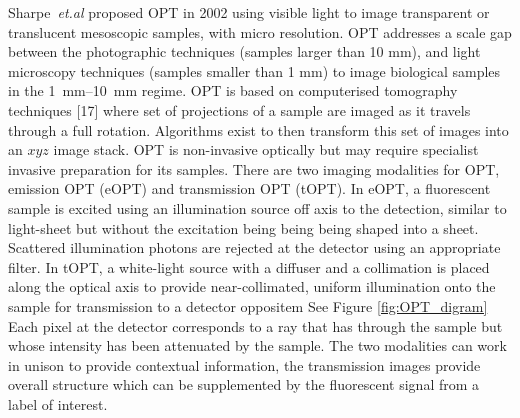 
Sharpe~\emph{et.al} proposed \gls{OPT} in 2002 \cite{sharpe_optical_2002}
using visible light to image transparent or translucent mesoscopic samples, with micro resolution.
\gls{OPT} addresses a scale gap between the photographic techniques (samples larger than 10 mm), and light microscopy techniques (samples smaller than 1 mm) to image biological samples in the \SIrange{1}{10}{\milli\meter} regime.
\gls{OPT} is based on computerised tomography techniques [17] where set of projections of a sample are imaged as it travels through a full rotation.
Algorithms exist to then transform this set of images into an $xyz$ image stack.
OPT is non-invasive optically but may require specialist invasive preparation for its samples.
There are two imaging modalities for OPT, emission \gls{OPT} (eOPT) and transmission OPT (tOPT).
In eOPT, a fluorescent sample is excited using an illumination source off axis to the detection, similar to light-sheet but without the excitation being being being shaped into a sheet.
Scattered illumination photons are rejected at the detector using an appropriate filter.
In tOPT, a white-light source with a diffuser and a collimation is placed along the optical axis to provide near-collimated, uniform illumination onto the sample for transmission to a detector oppositem See Figure \ref{fig:OPT_digram}%
Each pixel at the detector corresponds to a ray that has through the sample but whose intensity has been attenuated by the sample.
The two modalities can work in unison to provide contextual information, the transmission images provide overall structure which can be supplemented by the fluorescent signal from a label of interest.

